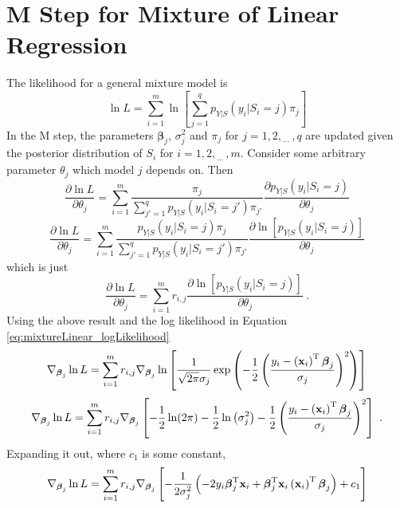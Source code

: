 \documentclass[12pt]{report}
\newcommand{\T}{^\textup{T}}
\newcommand{\dotdotdot}{_{\phantom{.}\cdots}}
\newcommand{\vect}[1]{\mathbf{#1}}
\newcommand{\vectGreek}[1]{\boldsymbol{#1}}
\begin{document}
\section{M Step for Mixture of Linear Regression} \label{section:Mstep}
The likelihood for a general mixture model is
\begin{equation}
\ln{L}=\sum_{i=1}^m\ln\left[
\sum_{j=1}^qp_{Y|S}\left(y_i|S_i=j\right)\pi_j
\right]
\end{equation}
In the M step, the parameters $\vectGreek{\beta}_j$, $\sigma_j^2$ and $\pi_j$ for $j=1,2,\dotdotdot,q$ are updated given the posterior distribution of $S_i$ for $i=1,2,\dotdotdot,m$. Consider some arbitrary parameter $\theta_j$ which model $j$ depends on. Then
\begin{equation*}
\frac{\partial\ln{L}}{\partial\theta_j}=
\sum_{i=1}^m\frac{\pi_j}{\sum_{j'=1}^qp_{Y|S}\left(y_i|S_i=j'\right)\pi_{j'}}
\frac{\partial p_{Y|S}\left(y_i|S_i=j\right)}{\partial\theta_j}
\end{equation*}
\begin{equation*}
\frac{\partial\ln{L}}{\partial\theta_j}=
\sum_{i=1}^m\frac{p_{Y|S}\left(y_i|S_i=j\right)\pi_j}{\sum_{j'=1}^qp_{Y|S}\left(y_i|S_i=j'\right)\pi_{j'}}
\frac{\partial \ln\left[p_{Y|S}\left(y_i|S_i=j\right)\right]}{\partial\theta_j}
\end{equation*}
which is just
\begin{equation}
\frac{\partial\ln{L}}{\partial\theta_j}=
\sum_{i=1}^mr_{i,j}
\frac{\partial \ln\left[p_{Y|S}\left(y_i|S_i=j\right)\right]}{\partial\theta_j} \ .
\end{equation}
Using the above result and the log likelihood in Equation \eqref{eq:mixtureLinear_logLikelihood}
\begin{equation*}
\nabla_{\vectGreek{\beta}_j}\ln{L}
=\sum_{i=1}^{m}
r_{i,j}
\nabla_{\vectGreek{\beta}_j}
\ln\left[
	\frac{1}{\sqrt{2\pi}\sigma_j}\exp\left(-\frac{1}{2}\left(\frac{y_i-\left(\vect{x}_i\right)\T\vectGreek{\beta}_j}{\sigma_j}\right)^2\right)
\right]
\end{equation*}
\begin{equation*}
\nabla_{\vectGreek{\beta}_j}\ln{L}
=\sum_{i=1}^{m}
r_{i,j}
\nabla_{\vectGreek{\beta}_j}
\left[
	-\frac{1}{2}\ln(2\pi) - \frac{1}{2}\ln\left(\sigma_j^2\right)-\frac{1}{2}\left(\frac{y_i-\left(\vect{x}_i\right)\T\vectGreek{\beta}_j}{\sigma_j}\right)^2
\right] \ .
\end{equation*}
Expanding it out, where $c_1$ is some constant,
\begin{equation*}
\nabla_{\vectGreek{\beta}_j}\ln{L}
=\sum_{i=1}^{m}
r_{i,j}
\nabla_{\vectGreek{\beta}_j}
\left[-\frac{1}{2\sigma_j^2}\left(-2y_i\vectGreek{\beta}_j\T\vect{x}_i
+\vectGreek{\beta}_j\T\vect{x}_i\left(\vect{x}_i\right)\T\vectGreek{\beta}_j
\right)
+c_1
\right]
\end{equation*}
\end{document}
